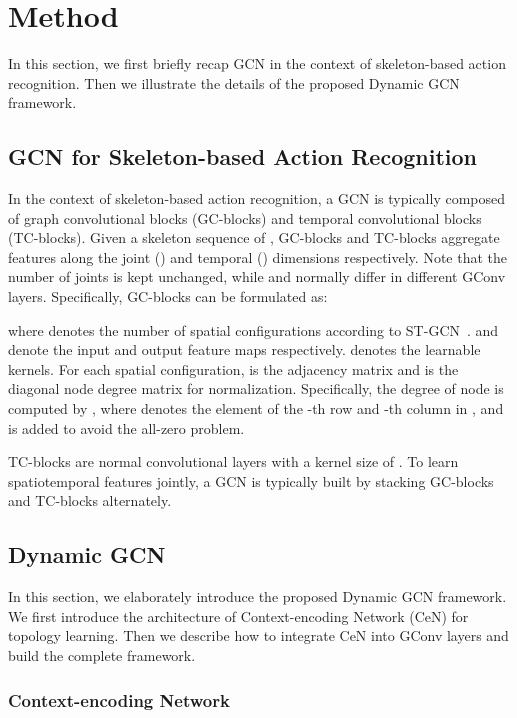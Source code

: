 \documentclass[sigconf]{acmart}
\begin{document}
\section{Method}
In this section, we first briefly recap GCN in the context of skeleton-based action recognition. Then we illustrate the details of the proposed Dynamic GCN framework.

\subsection{GCN for Skeleton-based Action Recognition}



In the context of skeleton-based action recognition, a GCN is typically composed of graph convolutional blocks (GC-blocks) and temporal convolutional blocks (TC-blocks). Given a skeleton sequence of , GC-blocks and TC-blocks aggregate features along the joint () and temporal () dimensions respectively. Note that the number of joints  is kept unchanged, while  and  normally differ in different GConv layers. Specifically, GC-blocks can be formulated as:

where  denotes the number of spatial configurations according to ST-GCN~\cite{yanspatial}.  and  denote the input and output feature maps respectively.  denotes the learnable kernels. For each spatial configuration,  is the adjacency matrix and  is the diagonal node degree matrix for normalization. Specifically, the degree of node  is computed by , where  denotes the element of the -th row and -th column in , and  is added to avoid the all-zero problem.

TC-blocks are normal convolutional layers with a kernel size of . To learn spatiotemporal features jointly, a GCN is typically built by stacking GC-blocks and TC-blocks alternately.



\subsection{Dynamic GCN}

In this section, we elaborately introduce the proposed Dynamic GCN framework. We first introduce the architecture of Context-encoding Network (CeN) for topology learning. Then we describe how to integrate CeN into GConv layers and build the complete framework.

\subsubsection{Context-encoding Network}
\end{document}
